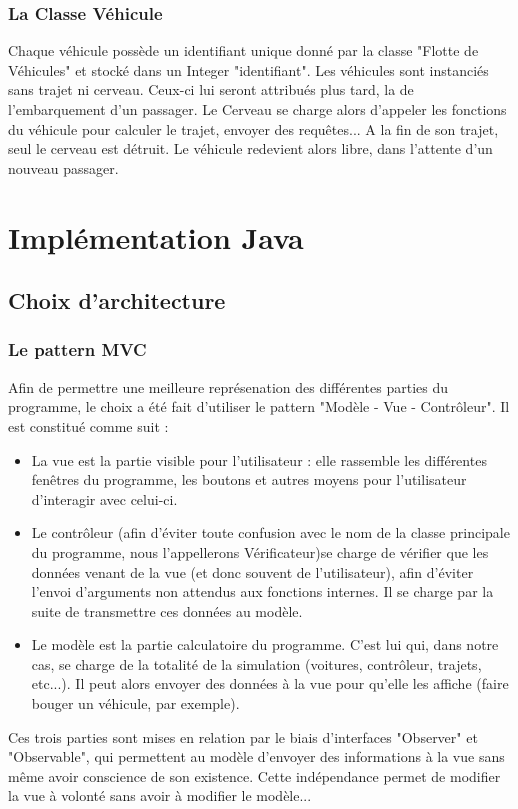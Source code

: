 \documentclass[a4paper, titlepage]{report}
\begin{document}
\section{La Classe Véhicule}

Chaque véhicule possède un identifiant unique donné par la classe "Flotte de Véhicules" et stocké  dans un Integer "identifiant". Les véhicules sont instanciés sans trajet ni cerveau. Ceux-ci lui seront attribués plus tard, la de l'embarquement d'un passager. Le Cerveau se charge alors d'appeler les fonctions du véhicule pour calculer le trajet, envoyer des requêtes...
A la fin de son trajet, seul le cerveau est détruit. Le véhicule  redevient alors libre, dans l'attente d'un nouveau passager.
\setcounter{chapter}{0}
\part{Implémentation Java}
\chapter{Choix d'architecture}
\section{Le pattern MVC}
Afin de permettre une meilleure représenation des différentes parties du programme, le choix a été fait d'utiliser le pattern "Modèle - Vue - Contrôleur". Il est constitué comme suit :\\
\begin{itemize}
\item La vue est la partie visible pour l'utilisateur : elle rassemble les différentes fenêtres du programme, les boutons et autres moyens pour l'utilisateur d'interagir avec celui-ci.
\item Le contrôleur (afin d'éviter toute confusion avec le nom de la classe principale du programme, nous l'appellerons Vérificateur)se charge de vérifier  que les données venant de la vue (et donc souvent de l'utilisateur), afin d'éviter l'envoi d'arguments non attendus aux fonctions internes. Il se charge par la suite de transmettre ces données au modèle.
\item Le modèle est la partie calculatoire du programme. C'est lui qui, dans notre cas, se charge de la totalité de la simulation (voitures, contrôleur, trajets, etc...). Il peut alors envoyer des données à la vue pour qu'elle les affiche (faire bouger un véhicule, par exemple).
\end{itemize}
Ces trois parties sont mises en relation par le biais d'interfaces "Observer" et "Observable", qui permettent au modèle d'envoyer des informations à la vue sans même avoir conscience de son existence. Cette indépendance permet de modifier la vue à volonté sans avoir à modifier le modèle...
\end{document}
